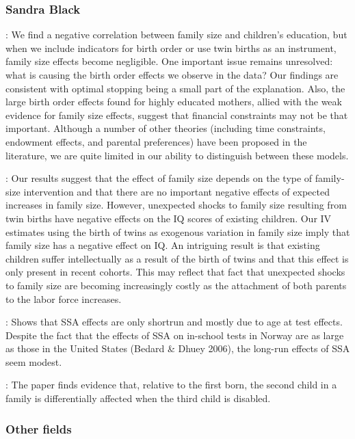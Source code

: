 \subsubsection{Sandra Black}
\cite{black_more_2005}: We find a negative correlation between family size and children’s education, but when we include indicators for birth order or use twin births as an instrument, family size effects become negligible. One important issue remains unresolved: what is causing the birth order effects we observe in the data? Our findings are consistent with optimal stopping being a small part of the explanation. Also, the large birth order effects found for highly educated mothers, allied with the weak evidence for family size effects, suggest that financial constraints may not be that important. Although a number of other theories (including time constraints, endowment effects, and parental preferences) have been proposed in the literature, we are quite limited in our ability to distinguish between these models.


\cite{black_small_2010}: Our results suggest that the effect of family size depends on the type of family-size intervention and that there are no important negative effects of expected increases in family size. However, unexpected shocks to family size resulting from twin births have negative effects on the IQ scores of existing children. Our IV estimates using the birth of twins as exogenous variation in family size imply that family size has a negative effect on IQ. An intriguing result is that existing children suffer intellectually as a result of the birth of twins and that this effect is only present in recent cohorts. This may reflect that fact that unexpected shocks to family size are becoming increasingly costly as the attachment of both parents to the labor force increases.

\cite{black_too_2011}: Shows that SSA effects are only shortrun and mostly due to age at test effects. Despite the fact that the effects of SSA on in-school tests in Norway are as large as those in the United States (Bedard & Dhuey 2006), the long-run effects of SSA seem modest.

\cite{black_sibling_2021}: The paper finds evidence that, relative to the first born, the second child in a family is differentially affected when the third child is disabled.


\subsubsection{Other fields}


